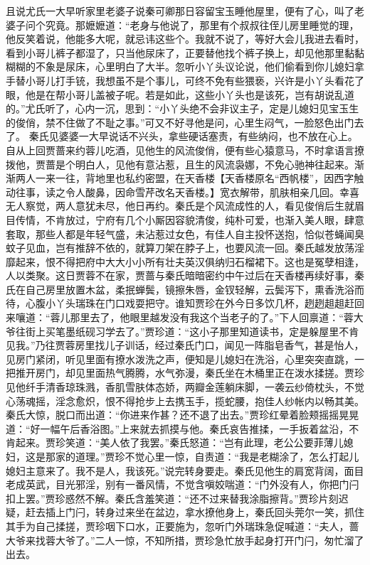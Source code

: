 \documentclass[12pt,oneside]{book}
\begin{document}
且说尤氏一大早听家里老婆子说秦可卿那日容留宝玉睡他屋里，便有了心，叫了老婆子问个究竟。那嬷嬷道：“老身与他说了，那里有个叔叔往侄儿房里睡觉的理，他反笑着说，他能多大呢，就忌讳这些个。我就不说了，等好大会儿我进去看时，看到小哥儿裤子都湿了，只当他尿床了，正要替他找个裤子换上，却见他那里黏黏糊糊的不象是尿床，心里明白了大半。忽听小丫头议论说，他们偷看到你儿媳妇拿手替小哥儿打手铳，我想虽不是个事儿，可终不免有些猥亵，兴许是小丫头看花了眼，他是在帮小哥儿盖被子呢。若是如此，这些小丫头也是该死，岂有胡说乱道的。”尤氏听了，心内一沉，思到：“小丫头绝不会非议主子，定是儿媳妇见宝玉生的俊俏，禁不住做了不耻之事。”可又不好寻他是问，心里生闷气，一脸怒色出门去了。
秦氏见婆婆一大早说话不兴头，拿些硬话塞责，有些纳闷，也不放在心上。自从上回贾蔷来约蓉儿吃酒，见他生的风流俊俏，便有些心猿意马，不时拿语言撩拨他，贾蔷是个明白人，见他有意沾惹，且生的风流袅娜，不免心驰神往起来。渐渐两人一来一往，背地里也私约密盟，在天香楼【天香楼原名“西帆楼”，因西字触动往事，读之令人酸鼻，因命雪芹改名天香楼。】宽衣解带，肌肤相亲几回。幸喜无人察觉，两人意犹未尽，他日再约。秦氏是个风流成性的人，看见俊俏后生就眉目传情，不肯放过，宁府有几个小厮因容貌清俊，纯朴可爱，也渐入美人眼，肆意套取，那些人都是年轻气盛，未沾惹过女色，有佳人自主投怀送抱，恰似苍蝇闻臭蚊子见血，岂有推辞不依的，就算刀架在脖子上，也要风流一回。秦氏越发放荡淫靡起来，恨不得把府中大大小小所有壮夫英汉俱纳归石榴裙下。这也是冤孽相逢，人以类聚。这日贾蓉不在家，贾蔷与秦氏暗暗密约中午过后在天香楼再续好事，秦氏在自己房里放置木盆，柔抿蝉鬓，镜擦朱唇，金钗轻解，云鬓泻下，熏香洗浴而待，心腹小丫头瑞珠在门口戏耍把守。谁知贾珍在外今日多饮几杯，趔趔趄趄赶回来嚷道：“蓉儿那里去了，他眼里越发没有我这个当老子的了。”下人回禀道：“蓉大爷往街上买笔墨纸砚习学去了。”贾珍道：“这小子那里知道读书，定是躲屋里不肯见我。”乃往贾蓉房里找儿子训话，经过秦氏门口，闻见一阵脂皂香气，甚是怡人，见房门紧闭，听见里面有撩水泼洗之声，便知是儿媳妇在洗浴，心里突突直跳，一把推开房门，却见里面热气腾腾，水气弥漫，秦氏坐在木桶里正在泼水揉搓。贾珍见他纤手清香琼珠溅，香肌雪肤体态娇，两瓣金莲躺床脚，一袭云纱倚枕头，不觉心荡魂摇，淫念愈炽，恨不得抢步上去携玉手，揽蛇腰，抱佳人纱帐内以畅其美。秦氏大惊，脱口而出道：“你进来作甚？还不退了出去。”贾珍红晕着脸颊摇摇晃晃道：“好一幅午后香浴图。”上来就去抓摸与他。秦氏哀告推揉，一手扳着盆沿，不肯起来。贾珍笑道：“美人依了我罢。”秦氏怒道：“岂有此理，老公公要菲薄儿媳妇，这是那家的道理。”贾珍不觉心里一惊，自责道：“我是老糊涂了，怎么打起儿媳妇主意来了。我不是人，我该死。”说完转身要走。秦氏见他生的肩宽背阔，面目老成英武，目光邪淫，别有一番风情，不觉含嗔姣喘道：“门外没有人，你把门闩扣上罢。”贾珍惑然不解。秦氏含羞笑道：“还不过来替我涂脂擦背。”贾珍片刻迟疑，赶去插上门闩，转身过来坐在盆边，拿水撩他身上，秦氏回头莞尔一笑，抓住其手为自己揉搓，贾珍咽下口水，正要施为，忽听门外瑞珠急促喊道：“夫人，蔷大爷来找蓉大爷了。”二人一惊，不知所措，贾珍急忙放手起身打开门闩，匆忙溜了出去。
\end{document}
